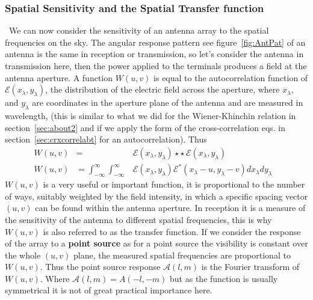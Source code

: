 \subsubsection{Spatial Sensitivity and the Spatial Transfer function}
\label{sec:SsSt}
{\citep[From][Sec.~5.3]{thompson2008interferometry}}~We can now consider the sensitivity of an antenna array to the spatial frequencies on the sky. The angular response pattern see figure~\ref{fig:AntPat} of an antenna is the same in reception or transmission, so let's consider the antenna in transmission here, then the power applied to the terminals produces a field at the antenna aperture. A function $W(u,v)$ is equal to the autocorrelation function of $\pmb{\mathscr{E}}(x_\lambda{,y_\lambda})$, the distribution of the electric field across the aperture, where $x_\lambda$, and $y_\lambda$ are coordinates in the aperture plane of the antenna and are measured in wavelength, (this is similar to what we did for the Wiener-Khinchin relation in section~\ref{sec:about2} and if we apply the form of the cross-correlation eqs. in section~\ref{sec:crxcorrelabt} for an autocorrelation). Thus 
\begin{align}
W(u,v) &=&\pmb{\mathscr{E}}(x_\lambda{,y_\lambda})\star{\star}{\,}\pmb{\mathscr{E}}(x_\lambda{,y_\lambda})& \nonumber \\
W(u,v) &= \int^{\infty}_{-\infty}\int^{\infty}_{-\infty}&\pmb{\mathscr{E}}(x_\lambda{,y_\lambda})\pmb{\mathscr{E}}^{\ast}(x_\lambda - u {,y_\lambda} - v)dx_\lambda{dy_\lambda}&
\end{align}
$W(u,v)$ is a very useful or important function, it is proportional to the number of ways, suitably weighted by the field intensity, in which a specific spacing vector $(u,v)$ can be found within the antenna aperture. In reception it is a measure of the sensitivity of the antenna to different spatial frequencies, this is why $W(u,v)$ is also referred to as the transfer function. If we consider the response of the array to a \textbf{point source} as for a point source the visibility is constant over the whole $(u,v)$ plane, the measured spatial frequencies are proportional to $W(u,v)$. Thus the point source response ${\mathcal{A}}(l,m)$ is the Fourier transform of $W(u,v)$. Where ${\mathcal{A}}(l,m) = A(-l,-m)$ but as the function is usually symmetrical it is not of great practical importance here.\\
